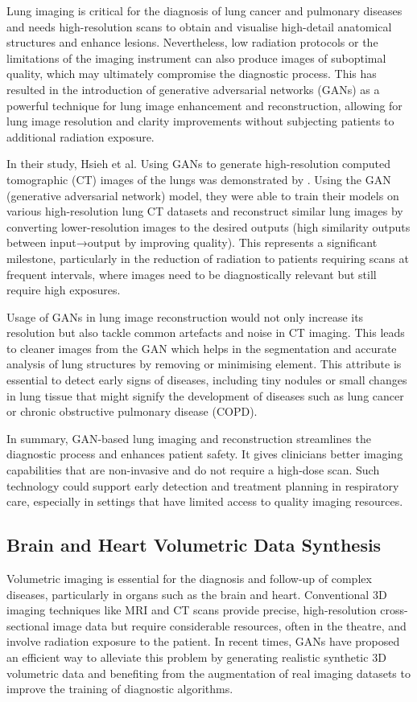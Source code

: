 \documentclass[12pt]{article}
\begin{document}
Lung imaging is critical for the diagnosis of lung cancer and pulmonary diseases and needs high-resolution scans to obtain and visualise high-detail anatomical structures and enhance lesions. Nevertheless, low radiation protocols or the limitations of the imaging instrument can also produce images of suboptimal quality, which may ultimately compromise the diagnostic process. This has resulted in the introduction of generative adversarial networks (GANs) as a powerful technique for lung image enhancement and reconstruction, allowing for lung image resolution and clarity improvements without subjecting patients to additional radiation exposure.

In their study, Hsieh et al. Using GANs to generate high-resolution computed tomographic (CT) images of the lungs was demonstrated by \cite{Hsieh2020}. Using the GAN (generative adversarial network) model, they were able to train their models on various high-resolution lung CT datasets and reconstruct similar lung images by converting lower-resolution images to the desired outputs (high similarity outputs between input→output by improving quality). This represents a significant milestone, particularly in the reduction of radiation to patients requiring scans at frequent intervals, where images need to be diagnostically relevant but still require high exposures.

Usage of GANs in lung image reconstruction would not only increase its resolution but also tackle common artefacts and noise in CT imaging. This leads to cleaner images from the GAN which helps in the segmentation and accurate analysis of lung structures by removing or minimising element. This attribute is essential to detect early signs of diseases, including tiny nodules or small changes in lung tissue that might signify the development of diseases such as lung cancer or chronic obstructive pulmonary disease (COPD).

In summary, GAN-based lung imaging and reconstruction streamlines the diagnostic process and enhances patient safety. It gives clinicians better imaging capabilities that are non-invasive and do not require a high-dose scan. Such technology could support early detection and treatment planning in respiratory care, especially in settings that have limited access to quality imaging resources.

\subsection{Brain and Heart Volumetric Data Synthesis}
Volumetric imaging is essential for the diagnosis and follow-up of complex diseases, particularly in organs such as the brain and heart. Conventional 3D imaging techniques like MRI and CT scans provide precise, high-resolution cross-sectional image data but require considerable resources, often in the theatre, and involve radiation exposure to the patient. In recent times, GANs have proposed an efficient way to alleviate this problem by generating realistic synthetic 3D volumetric data and benefiting from the augmentation of real imaging datasets to improve the training of diagnostic algorithms.
\end{document}
